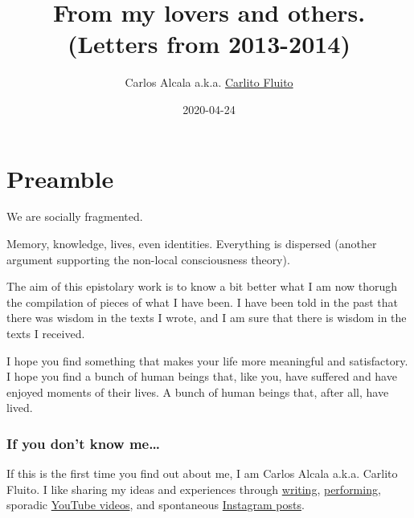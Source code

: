 \documentclass[]{book}
\title{From my lovers and others. (Letters from 2013-2014)}
\author{Carlos Alcala a.k.a. \href{www.carlitofluitoideas.com}{Carlito Fluito}}
\date{2020-04-24}
\begin{document}
\maketitle

{
\setcounter{tocdepth}{1}
\tableofcontents
}
\hypertarget{preamble}{%
\chapter*{Preamble}\label{preamble}}

We are socially fragmented.

Memory, knowledge, lives, even identities. Everything is dispersed (another argument supporting the non-local consciousness theory).

The aim of this epistolary work is to know a bit better what I am now thorugh the compilation of pieces of what I have been. I have been told in the past that there was wisdom in the texts I wrote, and I am sure that there is wisdom in the texts I received.

I hope you find something that makes your life more meaningful and satisfactory. I hope you find a bunch of human beings that, like you, have suffered and have enjoyed moments of their lives. A bunch of human beings that, after all, have lived.

\hypertarget{intro}{%
\subsection*{If you don't know me\ldots{}}\label{intro}}

If this is the first time you find out about me, I am Carlos Alcala a.k.a. Carlito Fluito. I like sharing my ideas and experiences through \href{www.carlitofluitoideas.com}{writing}, \href{www.carlitofluito.com}{performing}, sporadic \href{https://www.youtube.com/channel/UC5Q8igPq_lE1JQNwbjjy7wA}{YouTube videos}, and spontaneous \href{https://www.instagram.com/carlitofluito/?hl=en}{Instagram posts}.
\end{document}
